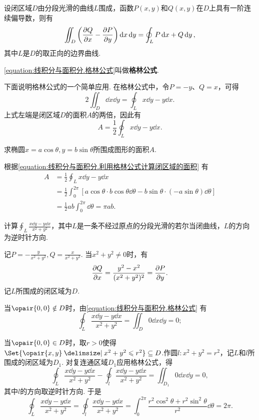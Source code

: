 \begin{theorem}[格林公式]
设闭区域\(D\)由分段光滑的曲线\(L\)围成，函数\(P(x,y)\)和\(Q(x,y)\)在\(D\)上具有一阶连续偏导数，则有
\begin{equation}\label{equation:线积分与面积分.格林公式}
\iint_D \left( \pdv{Q}{x} - \pdv{P}{y} \right) \dd{x}\dd{y}
= \oint_L P\dd{x} + Q\dd{y},
\end{equation}其中\(L\)是\(D\)的取正向的边界曲线.
\end{theorem}
\cref{equation:线积分与面积分.格林公式}叫做\textbf{格林公式}.

下面说明格林公式的一个简单应用.
在格林公式中，令\(P=-y\)、\(Q=x\)，可得\[
2 \iint_D \dd{x}\dd{y}
=\oint_L x\dd{y}-y\dd{x}.
\]上式左端是闭区域\(D\)的面积\(A\)的两倍，因此有
\begin{equation}\label{equation:线积分与面积分.利用格林公式计算闭区域的面积}
A = \frac{1}{2} \oint_L x\dd{y}-y\dd{x}.
\end{equation}
\begin{example}
求椭圆\(x = a \cos\theta, y = b \sin\theta\)所围成图形的面积\(A\).
\begin{solution}
根据\cref{equation:线积分与面积分.利用格林公式计算闭区域的面积} 有\begin{align*}
A &= \frac{1}{2} \oint_L x\dd{y}-y\dd{x} \\
&= \frac{1}{2} \int_0^{2\pi} \left[ a \cos\theta \cdot b \cos\theta \dd{\theta}
	- b \sin\theta \cdot (-a \sin\theta) \dd{\theta} \right] \\
&= \frac{1}{2} ab \int_0^{2\pi} \dd{\theta}
= \pi ab.
\end{align*}
\end{solution}
\end{example}

\begin{example}
计算\(\oint_L \frac{x\dd{y}-y\dd{x}}{x^2+y^2}\)，其中\(L\)是一条不经过原点的分段光滑的若尔当闭曲线，\(L\)的方向为逆时针方向.
\begin{solution}
记\(P = -\frac{y}{x^2+y^2}, Q = \frac{x}{x^2+y^2}\).
当\(x^2+y^2\neq0\)时，有\[
\pdv{Q}{x} = \frac{y^2-x^2}{(x^2+y^2)^2} = \pdv{P}{y}.
\]记\(L\)所围成的闭区域为\(D\).

当\(\opair{0,0} \notin D\)时，由\cref{equation:线积分与面积分.格林公式} 有\[
\oint_L \frac{x\dd{y}-y\dd{x}}{x^2+y^2} = \iint_D 0 \dd{x}\dd{y} = 0;
\]

当\(\opair{0,0} \in D\)时，取\(r>0\)使得\(\Set{ \opair{x,y} \given x^2+y^2 \leqslant r^2 } \subseteq D\).作圆\(l: x^2+y^2=r^2\)，记\(L\)和\(l\)所围成的闭区域为\(D_1\).
对复连通区域\(D_1\)应用格林公式，得\[
\oint_L \frac{x\dd{y}-y\dd{x}}{x^2+y^2} - \oint_l \frac{x\dd{y}-y\dd{x}}{x^2+y^2}
= \iint_{D_1} 0 \dd{x}\dd{y} = 0,
\]其中\(l\)的方向取逆时针方向.
于是\[
\oint_L \frac{x\dd{y}-y\dd{x}}{x^2+y^2}
= \oint_l \frac{x\dd{y}-y\dd{x}}{x^2+y^2}
= \int_0^{2\pi} \frac{r^2 \cos^2\theta + r^2 \sin^2\theta}{r^2} \dd{\theta}
= 2\pi.
\]
\end{solution}
\end{example}


